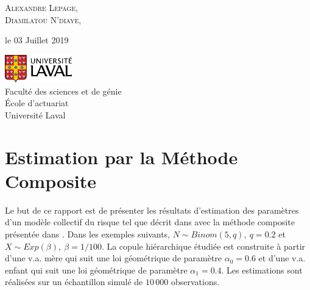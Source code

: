 \documentclass[11pt]{article}
\begin{document}
\begin{titlepage}
		\vspace{0.5\baselineskip} %
		
		{\scshape\Large Alexandre Lepage, \\
			Diamilatou N'diaye, \\} %
		
		\vspace*{5\baselineskip}
		
		le 03 Juillet 2019
		
		\vspace{0.5\baselineskip} %
		
		\vfill %
		
		
		\includegraphics[height=1.2cm]{graph/UL_P.pdf}\\
		
		Faculté des sciences et de génie\\
		École d'actuariat\\
		Université Laval\\     
	\end{titlepage}
	
	
	\setcounter{page}{0}
	
	\newpage
	\strut %
	\newpage
	
	\tableofcontents
	\newpage
	\renewcommand{\listfigurename}{Liste des illustrations}
	\listoffigures
	\newpage
	\listoftables
	\newpage
	
	\setcounter{page}{1}

\section{Estimation par la Méthode Composite} \label{sect_description_scenario}

	Le but de ce rapport est de présenter les résultats d'estimation des paramètres d'un modèle collectif du risque tel que décrit dans \cite{Itre5} avec la méthode composite présentée dans \cite{LikelyhoodEstimation}. Dans les exemples suivants, $N \sim Binom(5,q), \ q=0.2$ et $X \sim Exp(\beta) , \ \beta=1/100$. La copule hiérarchique étudiée est construite à partir d'une v.a. mère qui suit une loi géométrique de paramètre $\alpha_{0}=0.6$ et d'une v.a. enfant qui suit une loi géométrique de paramètre $\alpha_{1}=0.4$. Les estimations sont réalisées sur un échantillon simulé de $10\,000$ observations.
\end{document}
